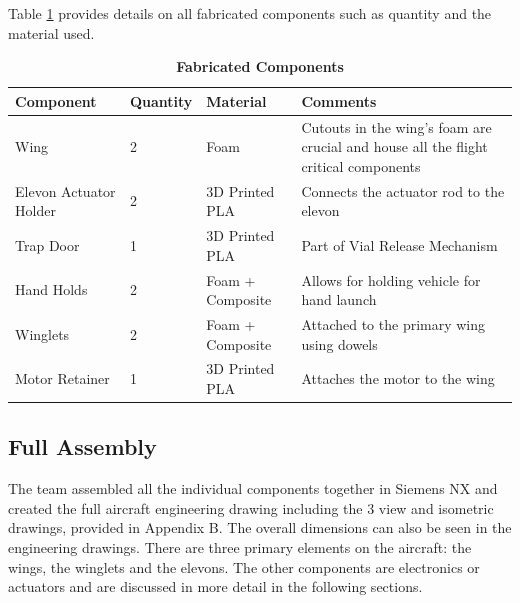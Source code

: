         Table \ref{table:fab_components} provides details on all fabricated components such as quantity and the material used.
        
        
        \begin{table}[H]
            \begin{center}
            \caption{\textbf{Fabricated Components}} \label{table:fab_components}
             \begin{tabular}{|p{1.6in}|p{0.7in}|p{1.3in}|p{1.5in}|} %
                \hline \textbf{Component} & \textbf{Quantity} & \textbf{Material} & \textbf{Comments} \\ \hline %
                Wing & 2 & Foam & Cutouts in the wing's foam are crucial and house all the flight critical components \\ \hline
                Elevon Actuator Holder & 2 & 3D Printed PLA & Connects the actuator rod to the elevon \\ \hline
                Trap Door & 1 & 3D Printed PLA & Part of Vial Release Mechanism \\ \hline
                Hand Holds & 2 & Foam + Composite & Allows for holding vehicle for hand launch \\ \hline
                Winglets & 2 & Foam + Composite & Attached to the primary wing using dowels \\  \hline
                Motor Retainer & 1 & 3D Printed PLA & Attaches the motor to the wing \\ \hline
            \end{tabular}
            \end{center}
        \end{table}
    
    \subsection{Full Assembly}
    
        The team assembled all the individual components together in Siemens NX and created the full aircraft engineering drawing including the 3 view and isometric drawings, provided in Appendix B. The overall dimensions can also be seen in the engineering drawings. There are three primary elements on the aircraft: the wings, the winglets and the elevons. The other components are electronics or actuators and are discussed in more detail in the following sections.
        
